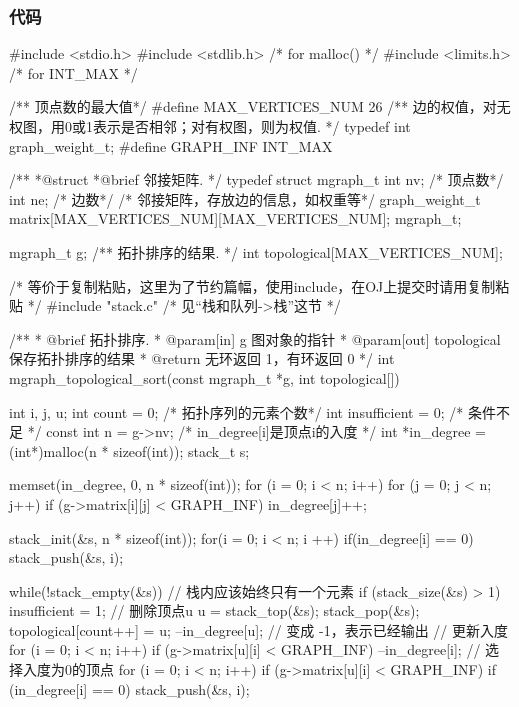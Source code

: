 \subsubsection{代码}
\begin{Codex}[label=poj_1094.c]
#include <stdio.h>
#include <stdlib.h>  /* for malloc() */
#include <limits.h>  /* for INT_MAX */

/** 顶点数的最大值*/
#define MAX_VERTICES_NUM 26
/** 边的权值，对无权图，用0或1表示是否相邻；对有权图，则为权值. */
typedef int graph_weight_t;
#define GRAPH_INF INT_MAX

/**
 *@struct
 *@brief 邻接矩阵.
 */
typedef struct mgraph_t {
    int nv; /* 顶点数*/
    int ne; /* 边数*/
    /* 邻接矩阵，存放边的信息，如权重等*/
    graph_weight_t matrix[MAX_VERTICES_NUM][MAX_VERTICES_NUM];
} mgraph_t;

mgraph_t g;
/** 拓扑排序的结果. */
int topological[MAX_VERTICES_NUM];

/* 等价于复制粘贴，这里为了节约篇幅，使用include，在OJ上提交时请用复制粘贴 */
#include "stack.c"  /* 见“栈和队列->栈”这节 */

/**
  * @brief 拓扑排序.
  * @param[in] g 图对象的指针
  * @param[out] topological 保存拓扑排序的结果
  * @return 无环返回 1，有环返回 0
  */
int mgraph_topological_sort(const mgraph_t *g, int topological[]) {
    int i, j, u;
    int count = 0; /* 拓扑序列的元素个数*/
    int insufficient = 0;  /* 条件不足 */
    const int n = g->nv;
    /* in_degree[i]是顶点i的入度 */
    int *in_degree = (int*)malloc(n * sizeof(int));
    stack_t s;

    memset(in_degree, 0, n * sizeof(int));
    for (i = 0; i < n; i++) {
        for (j = 0; j < n; j++) {
            if (g->matrix[i][j] < GRAPH_INF)
                in_degree[j]++;
        }
    }

    stack_init(&s, n * sizeof(int));
    for(i = 0; i < n; i ++) {
        if(in_degree[i] == 0) {
            stack_push(&s, i);
        }
    }

    while(!stack_empty(&s)) {
        // 栈内应该始终只有一个元素
        if (stack_size(&s) > 1) insufficient = 1;
        // 删除顶点u
        u = stack_top(&s); stack_pop(&s);
        topological[count++] = u;
        --in_degree[u];  // 变成 -1，表示已经输出
        // 更新入度
        for (i = 0; i < n; i++) if (g->matrix[u][i] < GRAPH_INF) {
            --in_degree[i];
        }
        // 选择入度为0的顶点
        for (i = 0; i < n; i++) if (g->matrix[u][i] < GRAPH_INF) {
            if (in_degree[i] == 0) stack_push(&s, i);
        }
    }

}
\end{Codex}
